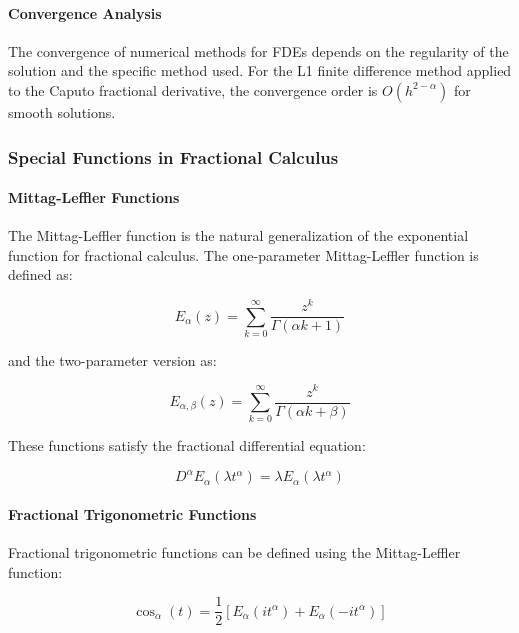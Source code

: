 \paragraph{Convergence Analysis}

The convergence of numerical methods for FDEs depends on the regularity of the solution and the specific method used. For the L1 finite difference method applied to the Caputo fractional derivative, the convergence order is $O(h^{2-\alpha})$ for smooth solutions.

\subsubsection{Special Functions in Fractional Calculus}

\paragraph{Mittag-Leffler Functions}

The Mittag-Leffler function is the natural generalization of the exponential function for fractional calculus. The one-parameter Mittag-Leffler function is defined as:

\begin{equation}
E_{\alpha}(z) = \sum_{k=0}^{\infty} \frac{z^k}{\Gamma(\alpha k + 1)}
\end{equation}

and the two-parameter version as:

\begin{equation}
E_{\alpha,\beta}(z) = \sum_{k=0}^{\infty} \frac{z^k}{\Gamma(\alpha k + \beta)}
\end{equation}

These functions satisfy the fractional differential equation:

\begin{equation}
D^{\alpha} E_{\alpha}(\lambda t^{\alpha}) = \lambda E_{\alpha}(\lambda t^{\alpha})
\end{equation}

\paragraph{Fractional Trigonometric Functions}

Fractional trigonometric functions can be defined using the Mittag-Leffler function:

\begin{equation}
\cos_{\alpha}(t) = \frac{1}{2}[E_{\alpha}(it^{\alpha}) + E_{\alpha}(-it^{\alpha})]
\end{equation}

